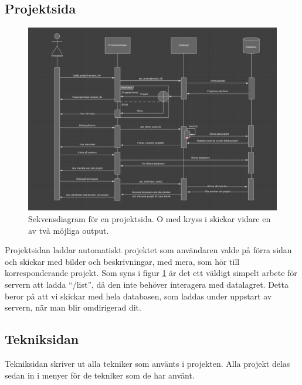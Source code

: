 \documentclass{TDP003mall}
\begin{document}
\subsection{Projektsida}
\begin{figure}[H]
    \centering
    \includegraphics[width=\linewidth]{final.PNG}
    \caption{Sekvensdiagram för en projektsida. O med kryss i skickar vidare en av två möjliga output.}
    \label{fig:proj}
\end{figure}
Projektsidan laddar automatiskt projektet som användaren valde på förra sidan och skickar med bilder och beskrivningar, med mera, som hör till korresponderande projekt. Som syns i figur \ref{fig:proj} är det ett väldigt simpelt arbete för servern att ladda ``/list'', då den inte behöver interagera med datalagret. Detta beror på att vi skickar med hela databasen, som laddas under uppstart av servern, när man blir omdirigerad dit. 
\subsection{Tekniksidan}
Tekniksidan skriver ut alla tekniker som använts i projekten. Alla projekt delas sedan in i menyer för de tekniker som de har använt.
\newpage
\end{document}
